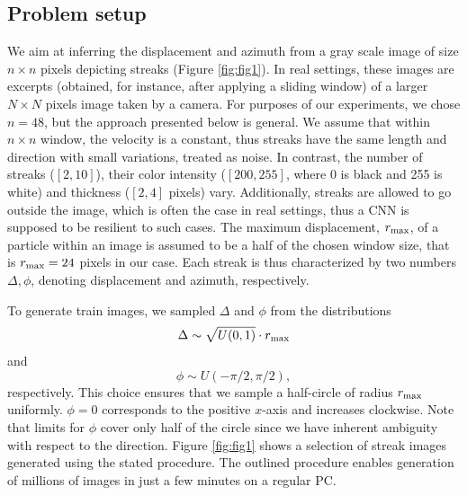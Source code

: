 \documentclass{svjour3}                     %
\begin{document}
\subsection{Problem setup}

We aim at inferring the displacement and azimuth from a gray scale image of size $n \times n$ pixels depicting streaks (Figure \ref{fig:fig1}). In real settings, these images are excerpts (obtained, for instance, after applying a sliding window) of a larger $N \times N$ pixels image taken by a camera. For purposes of our experiments, we chose $n = 48$, but the approach presented below is general. We assume that within $n \times n$ window, the velocity is a constant, thus streaks have the same length and direction with small variations, treated as noise. In contrast, the number of streaks ($[2, 10]$), their color intensity ($[200, 255]$, where 0 is black and 255 is white) and thickness ($[2, 4]$ pixels) vary. Additionally, streaks are allowed to go outside the image, which is often the case in real settings, thus a CNN is supposed to be resilient to such cases. The maximum displacement, $r_\textnormal{max}$, of a particle within an image is assumed to be a half of the chosen window size, that is $r_\textnormal{max} = 24$ pixels in our case. Each streak is thus characterized by two numbers $\Delta, \phi$, denoting displacement and azimuth, respectively. 

To generate train images, we sampled $\Delta$ and $\phi$ from the distributions
\begin{equation}
\Delta \sim \sqrt{U(0, 1)} \cdot r_\textnormal{max}
\end{equation}
and
\begin{equation}
\phi \sim U(-\pi/2, \pi/2),
\end{equation}
respectively. This choice ensures that we sample a half-circle of radius $r_\textnormal{max}$ uniformly. $\phi = 0$ corresponds to the positive $x$-axis and increases clockwise. Note that limits for $\phi$ cover only half of the circle since we have inherent ambiguity with respect to the direction. Figure \ref{fig:fig1} shows a selection of streak images generated using the stated procedure. The outlined procedure enables generation of millions of images in just a few minutes on a regular PC. 
\end{document}
